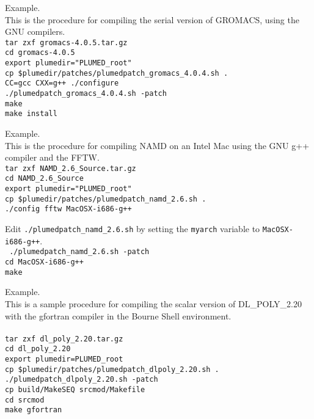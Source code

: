 \documentclass[12pt,fleqn]{report}
\newcommand{\esempio}[1]{
\vspace{10pt}
\begin{flushright}
\colorbox{light-gray}{
   \begin{minipage}{13cm}
       \scriptsize{
{\fontfamily{phv} \fontseries{b}
 \selectfont Example. \\
 \fontseries{m} \selectfont #1 } }
\end{minipage}}
\end{flushright}
\vspace{20pt}
}
\begin{document}
\esempio{This is the procedure for compiling the serial version of GROMACS, using the GNU compilers. \vspace{10pt} \\
{\tt tar zxf gromacs-4.0.5.tar.gz \\
cd gromacs-4.0.5 \\
export plumedir="PLUMED\_root" \\
cp \$plumedir/patches/plumedpatch\_gromacs\_4.0.4.sh . \\
CC=gcc CXX=g++ ./configure \\
./plumedpatch\_gromacs\_4.0.4.sh -patch \\
make \\
make install
}
}

\esempio{This is the procedure for compiling NAMD on an Intel Mac using the GNU g++ compiler and the FFTW. \vspace{10pt} \\
{\tt tar zxf NAMD\_2.6\_Source.tar.gz \\
cd NAMD\_2.6\_Source \\
export plumedir="PLUMED\_root" \\
cp \$plumedir/patches/plumedpatch\_namd\_2.6.sh . \\
./config fftw MacOSX-i686-g++ \\
}

Edit {\tt ./plumedpatch\_namd\_2.6.sh} by setting the  {\tt myarch} variable to {\tt MacOSX-i686-g++}.\\ 

{\tt
./plumedpatch\_namd\_2.6.sh -patch\\
cd MacOSX-i686-g++ \\
make 
}
}

\esempio{
This is a sample procedure for compiling the scalar version of DL\_POLY\_2.20 with the gfortran compiler in the Bourne Shell environment.\\ \\

{\tt tar zxf dl\_poly\_2.20.tar.gz \\
cd dl\_poly\_2.20\\
export plumedir=PLUMED\_root\\
cp \$plumedir/patches/plumedpatch\_dlpoly\_2.20.sh . \\
./plumedpatch\_dlpoly\_2.20.sh -patch\\
cp build/MakeSEQ srcmod/Makefile\\
cd srcmod\\
make gfortran
}}
\end{document}
